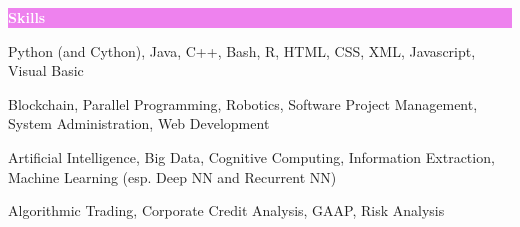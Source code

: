 \documentclass[letterpaper,11pt]{article}
\newcommand{\resheading}[1]{{\large \colorbox{violet}{\begin{minipage}{\textwidth}{\textbf{#1 \vphantom{p\^{E}}}}\end{minipage}}}}
\begin{document}
	\resheading{\textcolor{white}{Skills}}
	
	\begin{description}[itemsep=1pt]
		\item[Languages:] Python (and Cython), Java, C++, Bash, R, HTML, CSS, XML, Javascript, Visual Basic
		\item[Computer Science:]  Blockchain, Parallel Programming, Robotics, Software Project Management, System Administration, Web Development
		\item[Data Science:] Artificial Intelligence, Big Data, Cognitive Computing, Information Extraction, Machine Learning (esp. Deep NN and Recurrent NN)
		\item[Finance and Economics:] Algorithmic Trading, Corporate Credit Analysis, GAAP, Risk Analysis
	\end{description}
	
\end{document}
